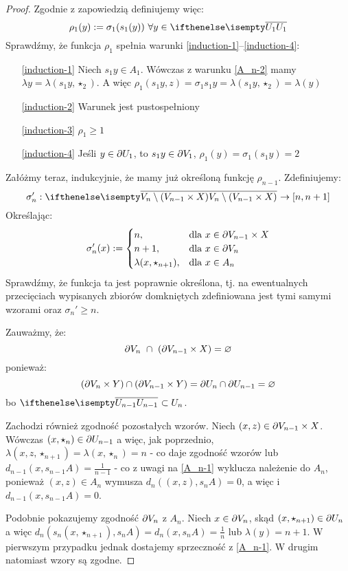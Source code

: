 \begin{thm}
\begin{proof}
  Zgodnie z zapowiedzią definiujemy więc:
  \[
    \rho_1(y) := \sigma_1(s_1(y))\ \forall y \in \cl{U_1}
  \]
  Sprawdźmy, że funkcja $\rho_1$ spełnia warunki \ref{induction-1}--\ref{induction-4}:
  \begin{enumerate}
   \item[\ref{induction-1}] Niech $s_1 y \in A_1$. Wówczas z warunku \ref{A_n-2} mamy $\lambda y = \lambda(s_1 y,\star_{2})$. A więc $\rho_1(s_1 y,z) = \sigma_1 s_1 y = \lambda(s_1 y,\star_2) = \lambda(y)$
   \item[\ref{induction-2}] Warunek jest pustospełniony
   \item[\ref{induction-3}] $\rho_1 \geq 1$
   \item[\ref{induction-4}] Jeśli $y\in\partial U_1$, to $s_1 y\in\partial V_1$, $\rho_1(y) = \sigma_1(s_1 y) = 2$
  \end{enumerate}
  Załóżmy teraz, indukcyjnie, że mamy już określoną funkcję $\rho_{n-1}$. Zdefiniujemy:  
  \[
    \sigma_n': \cl{V_n \setminus (V_{n-1} \times X)} \rightarrow [n,n+1]
  \]
  Określając:
  \[
  \sigma_n'(x) := 
    \begin{cases}
      n,&\mbox{dla }x \in \partial V_{n-1} \times X \\
      n+1,&\mbox{dla }x \in \partial V_n \\
      \lambda(x, \star_{n+1}),&\mbox{dla }x \in A_n
    \end{cases}
  \]
  Sprawdźmy, że funkcja ta jest poprawnie określona, tj. na ewentualnych przecięciach wypisanych zbiorów domkniętych zdefiniowana jest tymi samymi wzorami oraz $\sigma_n' \geq n$.
  
  Zauważmy, że:
  \[
    \partial V_n\ \cap\ (\partial V_{n-1} \times X) = \varnothing
  \]
  ponieważ:
  \[
    (\partial V_n \times Y) \cap (\partial V_{n-1} \times Y) = \partial U_n \cap \partial U_{n-1} = \varnothing
  \]
  bo $\cl{U_{n-1}} \subset U_n$.
  
  Zachodzi również zgodność pozostałych wzorów. Niech $(x, z) \in \partial V_{n-1} \times X$. Wówczas $(x, \star_n) \in \partial U_{n-1}$ a więc, jak poprzednio, $\lambda(x, z, \star_{n+1}) = \lambda(x, \star_n) = n$ - co daje zgodność wzorów lub $d_{n-1}(x, s_{n-1} A) = \frac{1}{n-1}$ - co z uwagi na \ref{A_n-1} wyklucza należenie do $A_n$, ponieważ $(x, z) \in A_n$ wymusza $d_{n}((x, z), s_{n} A) = 0$, a więc i $d_{n-1}(x, s_{n-1} A) = 0$.
  
  Podobnie pokazujemy zgodność $\partial V_n$ z $A_n$. Niech $x \in \partial V_n$, skąd $(x,\star_{n+1})\in\partial U_n$ a więc $d_n(s_n(x,\star_{n+1}), s_n A) = d_n(x,s_n A) = \frac{1}{n}$ lub $\lambda(y) = n+1$. W pierwszym przypadku jednak dostajemy sprzeczność z \ref{A_n-1}. W drugim natomiast wzory są zgodne.
  

\end{proof}
\end{thm}
